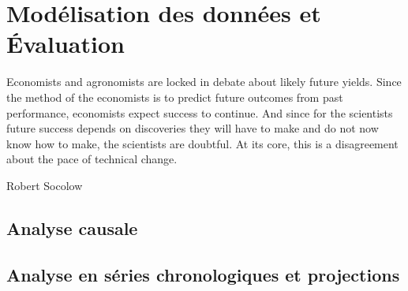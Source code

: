 \chapter{Modélisation des données et Évaluation}
\epigraph{Economists and agronomists are locked in debate about likely
future yields. Since the method of the economists is to predict
future outcomes from past performance, economists expect
success to continue. And since for the scientists future success
depends on discoveries they will have to make and do not now
know how to make, the scientists are doubtful. At its core, this is
a disagreement about the pace of technical change.}{Robert
Socolow}
\cleardoublepage

	\section{Analyse causale}
	\section{Analyse en séries chronologiques et projections}